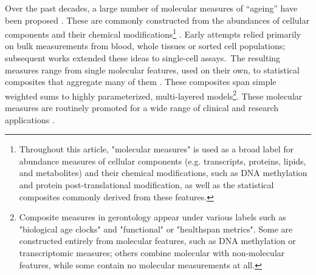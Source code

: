 \documentclass[twocolumn]{article} %
\begin{document}
Over the past decades, a large number of molecular measures of “ageing” have been proposed \citep[b]{kriukov2025we}. These are commonly constructed from the abundances of cellular components and their chemical modifications\footnote{Throughout this article, "molecular measures" is used as a broad label for abundance measures of cellular components (e.g. transcripts, proteins, lipids, and metabolites) and their chemical modifications, such as DNA methylation and protein post-translational modification, as well as the statistical composites commonly derived from these features.} \citep[a]{srour2025deep}. Early attempts relied primarily on bulk measurements from blood, whole tissues or sorted cell populations; subsequent works extended these ideas to single-cell assays. The resulting measures range from single molecular features, used on their own, to statistical composites that aggregate many of them \citep[b]{waziry2023effect}. These composites span simple weighted sums to highly parameterized, multi-layered models\footnote{Composite measures in gerontology appear under various labels such as "biological age clocks" and "functional" or "healthspan metrics". Some are constructed entirely from molecular features, such as DNA methylation or transcriptomic measures; others combine molecular with non-molecular features, while some contain no molecular measurements at all.}. These molecular measures are routinely promoted for a wide range of clinical and research applications \cite{hu2025house}. 
\end{document}
